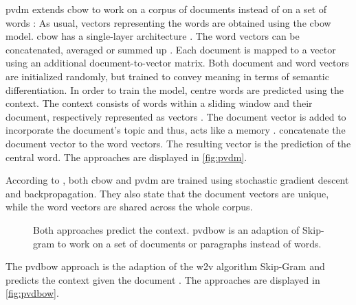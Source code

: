 \ac{pvdm} extends \ac{cbow} to work on a corpus of documents instead of on a set of words \cite{clusteringDocs2020}:
As usual, vectors representing the words are obtained using the \ac{cbow} model.
\ac{cbow} has a single-layer architecture \cite{glove2014}. %
The word vectors can be concatenated, averaged or summed up \cite{SentRep2014}.
Each document is mapped to a vector using an additional document-to-vector matrix.
Both document and word vectors are initialized randomly, but trained to convey meaning in terms of semantic differentiation.
In order to train the model, centre words are predicted using the context.
The context consists of words within a sliding window and their document, respectively represented as vectors \cite{SentRep2014}.
The document vector is added to incorporate the document's topic and thus, acts like a memory \cite{SentRep2014, Top2Vec2020}.
\citeauthor{SentRep2014} concatenate the document vector to the word vectors.
The resulting vector is the prediction of the central word.
The approaches are displayed in \autoref{fig:pvdm}.

According to \citeauthor{SentRep2014}, both \ac{cbow} and \ac{pvdm} are trained using stochastic gradient descent and backpropagation.
They also state that the document vectors are unique, while the word vectors are shared across the whole corpus. 

\begin{figure}%
    \centering
    \qquad
    \caption[Two \ac{pvdbow} architectures]{Both approaches predict the context.
    \ac{pvdbow} is an adaption of Skip-gram to work on a set of documents or paragraphs instead of words.
    }%
    \label{fig:pvdbow}%
\end{figure}
The \ac{pvdbow} approach is the adaption of the \ac{w2v} algorithm Skip-Gram and predicts the context 
given the document \cite{SentRep2014}.
The approaches are displayed in \autoref{fig:pvdbow}.


